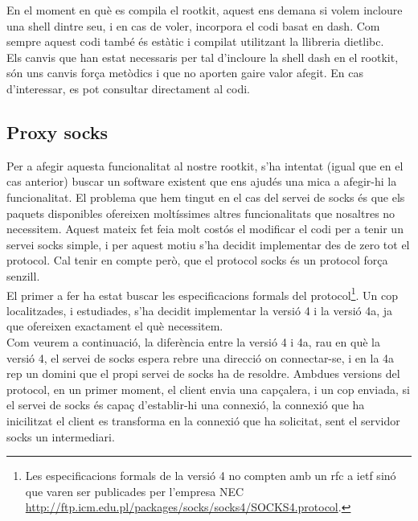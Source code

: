 En el moment en què es compila el rootkit, aquest ens demana si volem incloure una shell dintre seu, i en
cas de voler, incorpora el codi basat en dash. Com sempre aquest codi també és estàtic i compilat utilitzant
la llibreria dietlibc. \\

Els canvis que han estat necessaris per tal d'incloure la shell dash en el rootkit, són uns canvis força
metòdics i que no aporten gaire valor afegit. En cas d'interessar, es pot consultar directament al codi.\\

\subsection{Proxy socks}
Per a afegir aquesta funcionalitat al nostre rootkit, s'ha intentat (igual que en el cas anterior) buscar
un software existent que ens ajudés una mica a afegir-hi la funcionalitat. El problema que hem tingut en el cas del servei de
socks és que els paquets disponibles ofereixen moltíssimes altres funcionalitats que nosaltres no
necessitem. Aquest mateix fet feia molt costós el modificar el codi per a tenir un servei socks simple, i 
per aquest motiu s'ha decidit implementar des de zero tot el protocol. Cal tenir en compte però,
que el protocol socks és un protocol força senzill. \\

El primer a fer ha estat buscar les especificacions formals del protocol\footnote{Les especificacions 
formals de la versió 4 no compten amb un rfc a ietf sinó que varen ser publicades per l'empresa NEC \url{http://ftp.icm.edu.pl/packages/socks/socks4/SOCKS4.protocol}.}. Un cop localitzades, i estudiades, s'ha decidit implementar la versió 4 i la versió 4a, ja 
que ofereixen exactament el què necessitem. \\

Com veurem a continuació, la diferència entre la versió 4 i 4a, rau en què la versió 4, el servei de socks
espera rebre una direcció on connectar-se, i en la 4a rep un domini que el propi servei de socks ha de
resoldre. Ambdues versions del protocol, en un primer moment, el client envia una capçalera, i un cop enviada,
si el servei de socks és capaç d'establir-hi una connexió, la connexió que ha inicilitzat el client es
transforma en la connexió que ha solicitat, sent el servidor socks un intermediari.

